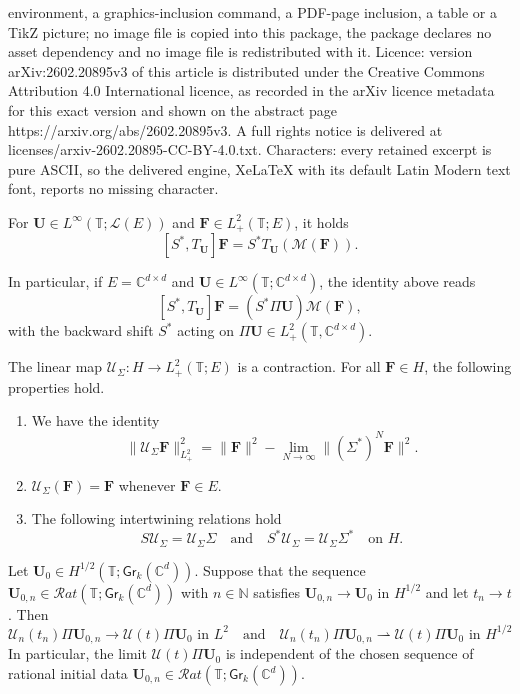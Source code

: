 \documentclass[10pt,a4paper]{amsart}
\newcommand{\C}{\mathbb{C}}
\newcommand{\Fb}{\mathbf{F}}
\newcommand{\Gr}{\mathsf{Gr}}
\newcommand{\Ls}{\mathscr{L}}
\newcommand{\Mean}{\mathscr{M}}
\newcommand{\N}{\mathbb{N}}
\newcommand{\T}{\mathbb{T}}
\newcommand{\Ub}{\mathbf{U}}
\newcommand{\Us}{\mathscr{U}}
\newcommand{\weakto}{\rightharpoonup}
\begin{document}
environment, a graphics-inclusion command, a PDF-page inclusion, a table or a TikZ picture; no image file is copied into this package, the package declares no asset dependency and no image file is redistributed with it. Licence: version arXiv:2602.20895v3 of this article is distributed under the Creative Commons Attribution 4.0 International licence, as recorded in the arXiv licence metadata for this exact version and shown on the abstract page https://arxiv.org/abs/2602.20895v3. A full rights notice is delivered at licenses/arxiv-2602.20895-CC-BY-4.0.txt. Characters: every retained excerpt is pure ASCII, so the delivered engine, XeLaTeX with its default Latin Modern text font, reports no missing character.
\begin{lem} \label{lem:commutator}
For $\Ub \in L^\infty(\T; \Ls(E))$ and $\Fb \in L^2_+(\T;E)$, it holds
$$
[S^*, T_\Ub] \Fb = S^* T_{\Ub}(\Mean(\Fb)).
$$

In particular, if  $E=\C^{d \times d}$ and $\Ub \in L^\infty(\T; \C^{d \times d})$, the identity above reads
$$
[S^*, T_\Ub] \Fb = (S^* \Pi \Ub)\Mean(\Fb),
$$
with the backward shift $S^*$ acting on $\Pi \Ub \in L^2_+(\T, \C^{d \times d})$.
\end{lem}

\begin{lem} \label{lem:UsSigma}
The linear map $\Us_\Sigma : H \to L^2_+(\T;E)$ is a contraction. For all $\Fb \in H$, the following properties hold.
\begin{enumerate}
\item[(i)] We have the identity
$$
\| \Us_\Sigma \Fb \|_{L^2_+}^2 = \| \Fb \|^2 - \lim_{N \to \infty} \| (\Sigma^*)^N \Fb \|^2.
$$
\item[(ii)] $\Us_\Sigma(\Fb) = \Fb$ whenever $\Fb \in E$.
\item[(iii)] The following intertwining relations hold
$$
S \Us_\Sigma = \Us_\Sigma \Sigma \quad \mbox{and} \quad S^* \Us_\Sigma = \Us_{\Sigma} \Sigma^* \quad \mbox{on $H$}.
$$ 
\end{enumerate}
\end{lem}

\begin{lem} \label{lem:GWP_minor}
Let $\Ub_0 \in H^{1/2}(\T; \Gr_k(\C^d))$. Suppose that the sequence $\Ub_{0,n} \in \mathcal{R}at(\T; \Gr_k(\C^d))$ with $n \in \N$ satisfies $\Ub_{0,n} \to \Ub_0$ in $H^{1/2}$ and let $t_n \to t$. Then 
$$
\mbox{$\Us_n(t_n) \Pi \Ub_{0,n} \to \Us(t) \Pi \Ub_0$ in $L^2$} \quad \mbox{and} \quad \mbox{$\Us_n(t_n) \Pi \Ub_{0,n} \weakto \Us(t) \Pi \Ub_0$ in $H^{1/2}$}
$$
In particular, the limit $\Us(t) \Pi \Ub_0$ is independent of the chosen sequence of rational initial data $\Ub_{0,n} \in \mathcal{R}at(\T; \Gr_k(\C^d))$. 
\end{lem}
\end{document}

